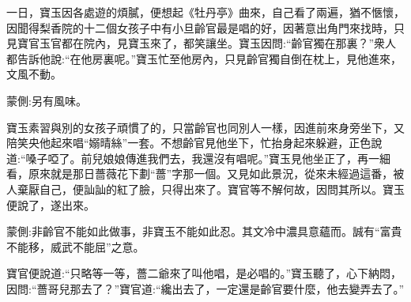 

\begin{parag}
    一日，寶玉因各處遊的煩膩，便想起《牡丹亭》曲來，自己看了兩遍，猶不愜懷，因聞得梨香院的十二個女孩子中有小旦齡官最是唱的好，因著意出角門來找時，只見寶官玉官都在院內，見寶玉來了，都笑讓坐。寶玉因問:“齡官獨在那裏？”衆人都告訴他說:“在他房裏呢。”寶玉忙至他房內，只見齡官獨自倒在枕上，見他進來，文風不動。\begin{note}蒙側:另有風味。\end{note}寶玉素習與別的女孩子頑慣了的，只當齡官也同別人一樣，因進前來身旁坐下，又陪笑央他起來唱“嫋晴絲”一套。不想齡官見他坐下，忙抬身起來躲避，正色說道:“嗓子啞了。前兒娘娘傳進我們去，我還沒有唱呢。”寶玉見他坐正了，再一細看，原來就是那日薔薇花下劃“薔”字那一個。又見如此景況，從來未經過這番，被人棄厭自己，便訕訕的紅了臉，只得出來了。寶官等不解何故，因問其所以。寶玉便說了，遂出來。\begin{note}蒙側:非齡官不能如此做事，非寶玉不能如此忍。其文冷中濃具意蘊而。誠有“富貴不能移，威武不能屈”之意。\end{note}寶官便說道:“只略等一等，薔二爺來了叫他唱，是必唱的。”寶玉聽了，心下納悶，因問:“薔哥兒那去了？”寶官道:“纔出去了，一定還是齡官要什麼，他去變弄去了。”
\end{parag}


